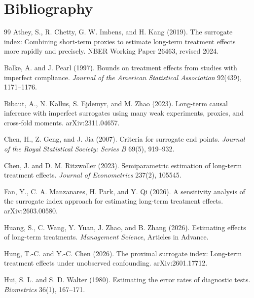 \documentclass[11pt]{article}
\theoremstyle{definition}
\theoremstyle{plain}
\theoremstyle{remark}
\begin{document}
\section*{Bibliography}
\begin{thebibliography}{99}
Athey, S., R. Chetty, G. W. Imbens, and H. Kang (2019).
\newblock The surrogate index: Combining short-term proxies to estimate long-term treatment effects more rapidly and precisely.
\newblock NBER Working Paper 26463, revised 2024.

Balke, A. and J. Pearl (1997).
\newblock Bounds on treatment effects from studies with imperfect compliance.
\newblock \emph{Journal of the American Statistical Association} 92(439), 1171--1176.

Bibaut, A., N. Kallus, S. Ejdemyr, and M. Zhao (2023).
\newblock Long-term causal inference with imperfect surrogates using many weak experiments, proxies, and cross-fold moments.
\newblock arXiv:2311.04657.

Chen, H., Z. Geng, and J. Jia (2007).
\newblock Criteria for surrogate end points.
\newblock \emph{Journal of the Royal Statistical Society: Series B} 69(5), 919--932.

Chen, J. and D. M. Ritzwoller (2023).
\newblock Semiparametric estimation of long-term treatment effects.
\newblock \emph{Journal of Econometrics} 237(2), 105545.

Fan, Y., C. A. Manzanares, H. Park, and Y. Qi (2026).
\newblock A sensitivity analysis of the surrogate index approach for estimating long-term treatment effects.
\newblock arXiv:2603.00580.

Huang, S., C. Wang, Y. Yuan, J. Zhao, and B. Zhang (2026).
\newblock Estimating effects of long-term treatments.
\newblock \emph{Management Science}, Articles in Advance.

Hung, T.-C. and Y.-C. Chen (2026).
\newblock The proximal surrogate index: Long-term treatment effects under unobserved confounding.
\newblock arXiv:2601.17712.

Hui, S. L. and S. D. Walter (1980).
\newblock Estimating the error rates of diagnostic tests.
\newblock \emph{Biometrics} 36(1), 167--171.


\end{thebibliography}
\end{document}
